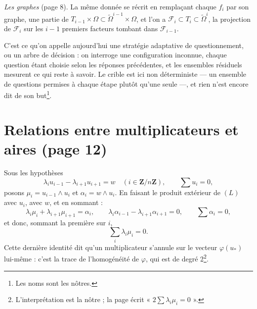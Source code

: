 \documentclass[11pt,a4paper]{article}
\begin{document}
\emph{Les graphes} (page 8). La même donnée se récrit en remplaçant chaque
$f_i$ par son graphe, une partie de $T_{i-1} \times \Omega \subset
\widetilde{\Omega}^{i-1} \times \Omega$, et l'on a
$\mathcal{F}_i \subset T_i \subset \widetilde{\Omega}^i$, la projection de
$\mathcal{F}_i$ sur les $i-1$ premiers facteurs tombant dans
$\mathcal{F}_{i-1}$.

C'est ce qu'on appelle aujourd'hui une stratégie adaptative de questionnement,
ou un arbre de décision : on interroge une configuration inconnue, chaque
question étant choisie selon les réponses précédentes, et les ensembles
résiduels mesurent ce qui reste à savoir. Le crible est ici non déterministe
--- un ensemble de questions permises à chaque étape plutôt qu'une seule ---, et
rien n'est encore dit de son but\footnote{Les noms sont les nôtres.}.

\section*{Relations entre multiplicateurs et aires (page 12)}

Sous les hypothèses
\[
  \lambda_i u_{i-1} - \lambda_{i+1} u_{i+1} = w \quad (i \in \mathbf{Z}/n\mathbf{Z}),
  \qquad \sum u_i = 0 ,
\]
posons $\mu_i = u_{i-1} \wedge u_i$ et $\alpha_i = w \wedge u_i$. En faisant
le produit extérieur de $(L)$ avec $u_i$, avec $w$, et en sommant :
\[
  \lambda_i \mu_i + \lambda_{i+1} \mu_{i+1} = \alpha_i ,
  \qquad
  \lambda_i \alpha_{i-1} - \lambda_{i+1} \alpha_{i+1} = 0 ,
  \qquad
  \sum \alpha_i = 0 ,
\]
et donc, sommant la première sur $i$,
\[
  \sum_i \lambda_i \mu_i = 0 .
\]
Cette dernière identité dit qu'un multiplicateur s'annule sur le vecteur
$\varphi(u_*)$ lui-même : c'est la trace de l'homogénéité de $\varphi$, qui est
de degré 2\footnote{L'interprétation est la nôtre ; la page écrit
« $2 \sum \lambda_i \mu_i = 0$ ».}.
\end{document}
